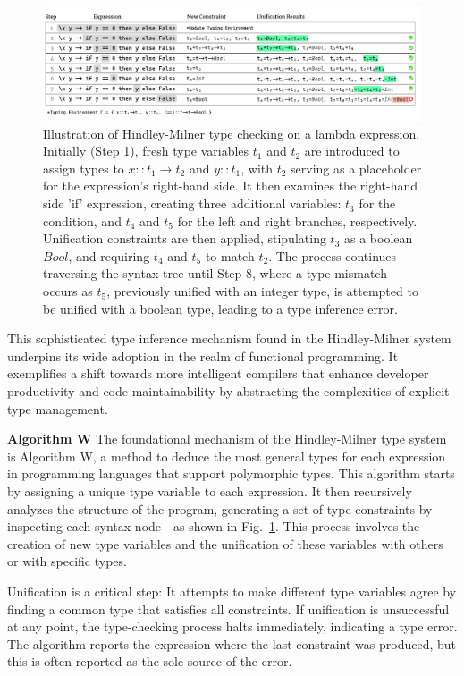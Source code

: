 \begin{figure}[hbt]
    \centering    \includegraphics[width=\linewidth]{HindleyMilner}
    \caption[Illustration of Hindley-Milner type checking on a lambda expression]{
      \label{fig:hindley-milner}
      Illustration of Hindley-Milner type checking on a lambda expression. Initially (Step 1), fresh type variables $t_1$  and $ t_2 $ are introduced to assign types to $x :: t_1 \to t_2$ and $y :: t_1$, with $ t_2$ serving as a placeholder for the expression’s right-hand side. It then examines the right-hand side 'if' expression, creating three additional variables: $t_3$ for the condition, and $t_4$ and $t_5$ for the left and right branches, respectively. Unification constraints are then applied, stipulating $t_3$ as a boolean $Bool$, and requiring $t_4$ and $t_5$ to match $t_2$. The process continues traversing the syntax tree until Step 8, where a type mismatch occurs as $t_5$, previously unified with an integer type, is attempted to be unified with a boolean type, leading to a type inference error.
       }
\end{figure}

This sophisticated type inference mechanism found in the Hindley-Milner system underpins its wide adoption in the realm of functional programming. It exemplifies a shift towards more intelligent compilers that enhance developer productivity and code maintainability by abstracting the complexities of explicit type management.

\textbf{Algorithm W}  The foundational mechanism of the Hindley-Milner type system is Algorithm W, a method to deduce the most general types for each expression in programming languages that support polymorphic types. This algorithm starts by assigning a unique type variable to each expression. It then recursively analyzes the structure of the program, generating a set of type constraints by inspecting each syntax node—as shown in Fig.~\ref{fig:hindley-milner}. This process involves the creation of new type variables and the unification of these variables with others or with specific types.

Unification is a critical step: It attempts to make different type variables agree by finding a common type that satisfies all constraints. If unification is unsuccessful at any point, the type-checking process halts immediately, indicating a type error. The algorithm reports the expression where the last constraint was produced, but this is often reported as the sole source of the error.

